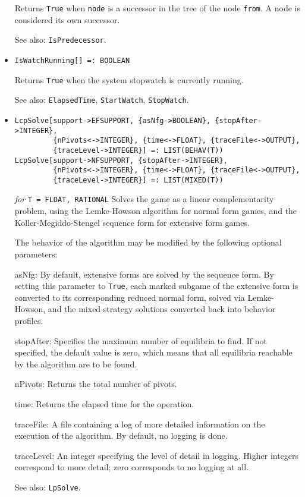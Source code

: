 \begin{itemize}
\bd
Returns \verb+True+ when \verb+node+ is a successor
in the tree of the node \verb+from+.  A node is considered its own successor.
\item [See also:] \verb+IsPredecessor+.
\ed

\item{}
\protect \large \begin{verbatim}
IsWatchRunning[] =: BOOLEAN
\end{verbatim}\normalsize

\bd
Returns \verb+True+ when the system stopwatch is currently running.
\item
[See also:] \verb+ElapsedTime+, \verb+StartWatch+, \verb+StopWatch+.
\ed





\item{}
\protect \large \begin{verbatim}
LcpSolve[support->EFSUPPORT, {asNfg->BOOLEAN}, {stopAfter->INTEGER},
         {nPivots<->INTEGER}, {time<->FLOAT}, {traceFile<->OUTPUT},
         {traceLevel->INTEGER}] =: LIST(BEHAV(T))
LcpSolve[support->NFSUPPORT, {stopAfter->INTEGER},
         {nPivots<->INTEGER}, {time<->FLOAT}, {traceFile<->OUTPUT},
         {traceLevel->INTEGER}] =: LIST(MIXED(T))
\end{verbatim}\normalsize

{\it for} {\tt T = FLOAT, RATIONAL}
\bd
Solves the game as a linear complementarity problem, using the
Lemke-Howson algorithm for normal form games, and the
Koller-Megiddo-Stengel sequence form for extensive form games.  


The behavior of the algorithm may be modified by the following
optional parameters:
\bd
\item
[asNfg:] By default, extensive forms are solved by the sequence form.
By setting this parameter to \verb+True+, each marked subgame of the extensive
form is converted to its corresponding reduced normal form, solved
via Lemke-Howson, and the mixed strategy solutions converted back into
behavior profiles.
\item
[stopAfter:] Specifies the maximum number of equilibria to find.  If
not specified, the default value is zero, which means that all
equilibria reachable by the algorithm are to be found.
\item
[nPivots:] Returns the total number of pivots. 
\item
[time:] Returns the elapsed time for the operation.
\item
[traceFile:] A file containing a log of more detailed information on the
execution of the algorithm.  By default, no logging is done.
\item
[traceLevel:] An integer specifying the level of detail in logging.
Higher integers correspond to more detail; zero corresponds to no
logging at all.
\ed
\item [See also:] \verb+LpSolve+.
\ed


\end{itemize}
